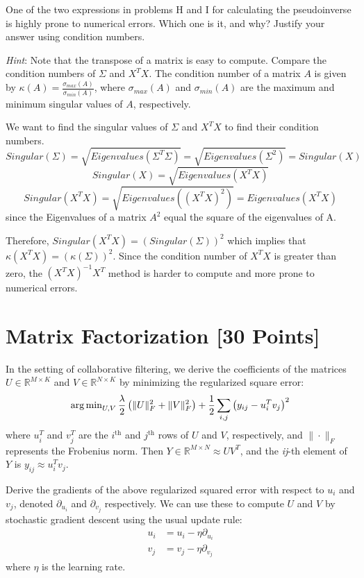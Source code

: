 \problem[2] One of the two expressions in problems H and I for calculating the pseudoinverse is highly prone to numerical errors. Which one is it, and why? Justify your answer using condition numbers.

\textit{Hint}: Note that the transpose of a matrix is easy to compute. Compare the condition numbers of $\Sigma$ and $X^T X$. The condition number of a matrix $A$ is given by $\kappa(A) = \frac{\sigma_{max}(A)}{\sigma_{min}(A)}$, where $\sigma_{max}(A)$ and $\sigma_{min}(A)$ are the maximum and minimum singular values of $A$, respectively.

\begin{solution}
	We want to find the singular values of $\Sigma$ and $X^TX$ to find their condition numbers.
	$$Singular(\Sigma) = \sqrt{Eigenvalues(\Sigma^T\Sigma)}= \sqrt{Eigenvalues(\Sigma^2)} = Singular(X)$$
	$$Singular(X) = \sqrt{Eigenvalues(X^TX)}$$
	$$Singular(X^TX) = \sqrt{Eigenvalues((X^TX)^2)} = Eigenvalues(X^TX)$$
	since the Eigenvalues of a matrix $A^2$ equal the square of the eigenvalues of A.

	Therefore, $Singular(X^TX) = (Singular(\Sigma))^2$ which implies that $\kappa(X^TX) = (\kappa(\Sigma))^2$. Since the condition number of $X^TX$ is greater than zero, the $(X^TX)^{-1}X^T$ method is harder to compute and more prone to numerical errors.
\end{solution}



\newpage
\section{Matrix Factorization [30 Points]}

In the setting of collaborative filtering, we derive the coefficients of the matrices $U \in \mathbb{R}^{M \times K}$ and $V \in \mathbb{R}^{N \times K}$ by minimizing the regularized square error:
$$\operatorname{arg\,min}_{U,V} \frac{\lambda}{2} \left( \|U\|_F^2 + \|V\|^2_F \right) + \frac{1}{2}\sum_{i,j} \left( y_{ij} - u_i^Tv_j\right)^2$$
where $u_i^T$ and $v_j^T$ are the $i^{\text{th}}$ and $j^{\text{th}}$ rows of $U$ and $V$, respectively, and $\|\cdot\|_F$ represents the Frobenius norm. Then $Y \in \mathbb{R}^{M \times N} \approx UV^T$, and the \textit{ij}-th element of $Y$ is $y_{ij} \approx u_i^Tv_j$.

\problem[5]Derive the gradients of the above regularized squared error with respect to $u_i$ and $v_j$, denoted $\partial_{u_i}$ and $\partial_{v_j}$ respectively.  We can use these to compute $U$ and $V$ by stochastic gradient descent using the usual update rule: 
\begin{align*}
u_i &= u_i - \eta \partial_{u_i} \\
v_j &= v_j - \eta \partial_{v_j}
\end{align*}
where $\eta$ is the learning rate.

